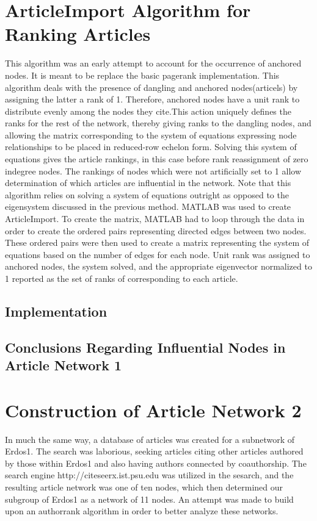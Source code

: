 \documentclass[17pt]{extarticle}
\begin{document}
\section{ArticleImport Algorithm for Ranking Articles}
    This algorithm was an early attempt to account for the occurrence of anchored nodes. It is meant to be replace the basic pagerank implementation. This algorithm deals with the presence of dangling and anchored nodes(articels) by assigning the latter a rank of 1. Therefore, anchored nodes have a unit rank to distribute evenly among the nodes they cite.This action uniquely defines the ranks for the rest of the network, thereby giving ranks to the dangling nodes, and allowing the matrix corresponding to the system of equations expressing node relationships to be placed in reduced-row echelon form. Solving this system of equations gives the article rankings, in this case before rank reassignment of zero indegree nodes. The rankings of nodes which were not artificially set to 1 allow determination of which articles are influential in the network. Note that this algorithm relies on solving a system of equations outright as opposed to the eigensystem discussed in the previous method. MATLAB was used to create ArticleImport. To create the matrix, MATLAB had to loop through the data in order to create the ordered pairs representing directed edges between two nodes. These ordered pairs were then used to create a matrix representing the system of equations based on the number of edges for each node. Unit rank was assigned to anchored nodes, the system solved, and the appropriate eigenvector normalized to 1 reported as the set of ranks of corresponding to each article.
    \subsection{Implementation}

    
      
    \subsection{Conclusions Regarding Influential Nodes in Article Network 1}
    
\section{Construction of Article Network 2}
In much the same way, a database of articles was created for a subnetwork of Erdos1. The search was laborious, seeking articles citing other articles authored by those within Erdos1 and also having authors connected by coauthorship. The search engine http://citeseerx.ist.psu.edu was utilized in the sesarch, and the resulting article network was one of ten nodes, which then determined our subgroup of Erdos1 as a network of 11 nodes. An attempt was made to build upon an authorrank algorithm in order to better analyze these networks.
\end{document}
